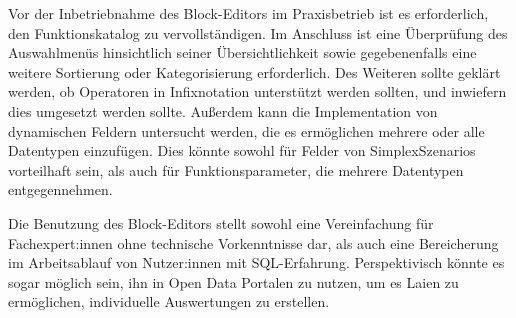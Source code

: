 Vor der Inbetriebnahme des Block-Editors im Praxisbetrieb ist es erforderlich, den Funktionskatalog zu vervollständigen. Im Anschluss ist eine Überprüfung des Auswahlmenüs hinsichtlich seiner Übersichtlichkeit sowie gegebenenfalls eine weitere Sortierung oder Kategorisierung erforderlich. Des Weiteren sollte geklärt werden, ob Operatoren in Infixnotation unterstützt werden sollten, und inwiefern dies umgesetzt werden sollte. Außerdem kann die Implementation von dynamischen Feldern untersucht werden, die es ermöglichen mehrere oder alle Datentypen einzufügen. Dies könnte sowohl für Felder von SimplexSzenarios vorteilhaft sein, als auch für Funktionsparameter, die mehrere Datentypen entgegennehmen.

\pskip
Die Benutzung des Block-Editors stellt sowohl eine Vereinfachung für Fachexpert:innen ohne technische Vorkenntnisse dar, als auch eine Bereicherung im Arbeitsablauf von Nutzer:innen mit \ac{SQL}-Erfahrung. Perspektivisch könnte es sogar möglich sein, ihn in Open Data Portalen zu nutzen, um es Laien zu ermöglichen, individuelle Auswertungen zu erstellen.
